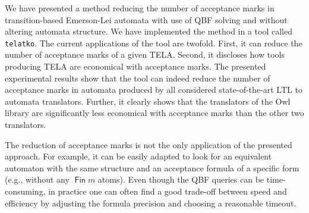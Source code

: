 \documentclass[a4paper,UKenglish,cleveref,autoref,thm-restate]{lipics-v2021}
\DeclareMathOperator{\Fin}{\mathsf{Fin}}
\begin{document}
We have presented a method reducing the number of acceptance marks in
transition-based Emerson-Lei automata with use of QBF solving and
without altering automata structure. We have implemented the method in
a tool called \texttt{telatko}. The current applications of the tool
are twofold. First, it can reduce the number of acceptance marks of a
given TELA. Second, it discloses how tools producing TELA are
economical with acceptance marks. The presented experimental results
show that the tool can indeed reduce the number of acceptance marks in
automata produced by all considered state-of-the-art LTL to automata
translators. Further, it clearly shows that the translators of the Owl
library are significantly less economical with acceptance marks than
the other two translators.

The reduction of acceptance marks is not the only application of the
presented approach. For example, it can be easily adapted to look for
an equivalent automaton with the same structure and an acceptance
formula of a specific form (e.g., without any $\Fin m$ atoms). Even
though the QBF queries can be time-consuming, in practice one can
often find a good trade-off between speed and efficiency by adjusting 
the formula precision and choosing a reasonable timeout.





%

\end{document}
